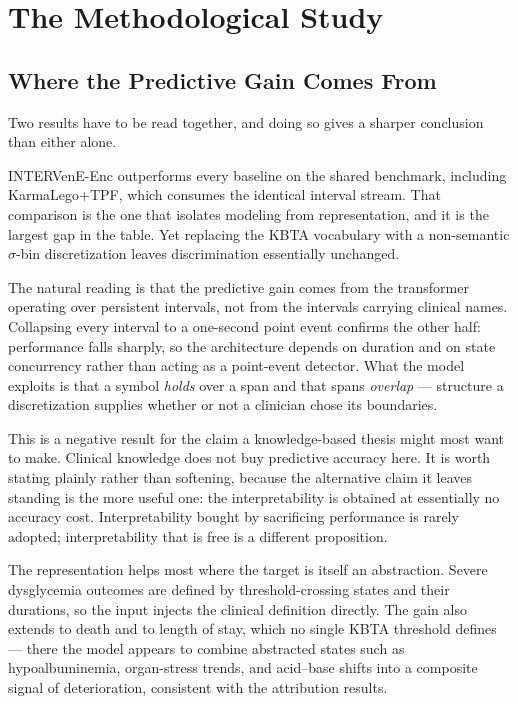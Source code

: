 \section{The Methodological Study}
\label{sec:disc-methodological}

\subsection{Where the Predictive Gain Comes From}

Two results have to be read together, and doing so gives a sharper conclusion than either alone.

INTERVenE-Enc outperforms every baseline on the shared benchmark, including KarmaLego+TPF, which consumes the identical interval stream. That comparison is the one that isolates modeling from representation, and it is the largest gap in the table. Yet replacing the KBTA vocabulary with a non-semantic $\sigma$-bin discretization leaves discrimination essentially unchanged.

The natural reading is that the predictive gain comes from the transformer operating over persistent intervals, not from the intervals carrying clinical names. Collapsing every interval to a one-second point event confirms the other half: performance falls sharply, so the architecture depends on duration and on state concurrency rather than acting as a point-event detector. What the model exploits is that a symbol \emph{holds} over a span and that spans \emph{overlap} --- structure a discretization supplies whether or not a clinician chose its boundaries.

This is a negative result for the claim a knowledge-based thesis might most want to make. Clinical knowledge does not buy predictive accuracy here. It is worth stating plainly rather than softening, because the alternative claim it leaves standing is the more useful one: the interpretability is obtained at essentially no accuracy cost. Interpretability bought by sacrificing performance is rarely adopted; interpretability that is free is a different proposition.

The representation helps most where the target is itself an abstraction. Severe dysglycemia outcomes are defined by threshold-crossing states and their durations, so the input injects the clinical definition directly. The gain also extends to death and to length of stay, which no single KBTA threshold defines --- there the model appears to combine abstracted states such as hypoalbuminemia, organ-stress trends, and acid--base shifts into a composite signal of deterioration, consistent with the attribution results.

